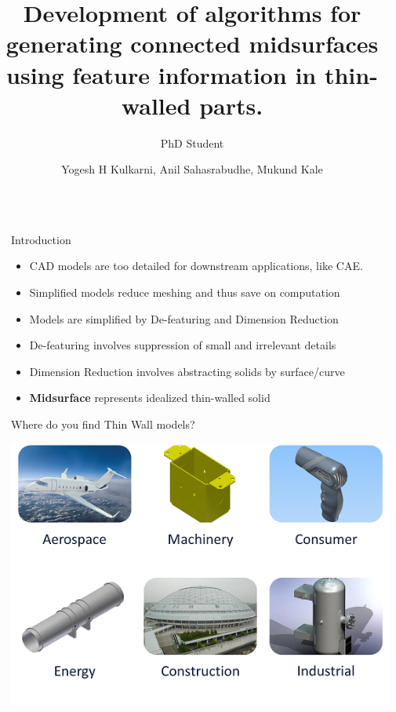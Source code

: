 \documentclass[final]{beamer}
\title {\huge Development of algorithms for generating connected midsurfaces using feature information in thin-walled parts.}
\author{Yogesh H Kulkarni, Anil Sahasrabudhe, Mukund Kale}
\institute[CoEP]{College of Engineering Pune, India }
\subtitle[]{PhD Student}
\newlength{\seperationwidth}
\newlength{\onecolumnwidth}
\begin{document}
\begin{frame}[t] %

\begin{columns}[t] %
\begin{column}{\seperationwidth}\end{column} %

\begin{column}{\onecolumnwidth} %

	\begin{block}{Introduction}
	

		\begin{itemize}[noitemsep,nolistsep]
		
			\item CAD models are too detailed for downstream applications, like CAE.
			\item Simplified models reduce meshing and thus save on computation
			\item Models are simplified by De-featuring and Dimension Reduction
			\item De-featuring involves suppression of small and irrelevant details
			\item Dimension Reduction involves abstracting solids by surface/curve
			\item \textbf{Midsurface} represents idealized thin-walled solid
				
		\end{itemize}
					
	\end{block}
		
	\begin{block}{Where do you find Thin Wall models?}
	
		\begin{center}	
		
			\includegraphics[width=0.6\linewidth]{../Common/images/ThinWallApplications.png}
			

\end{center}
\end{block}
\end{column}
\end{columns}
\end{frame}
\end{document}
